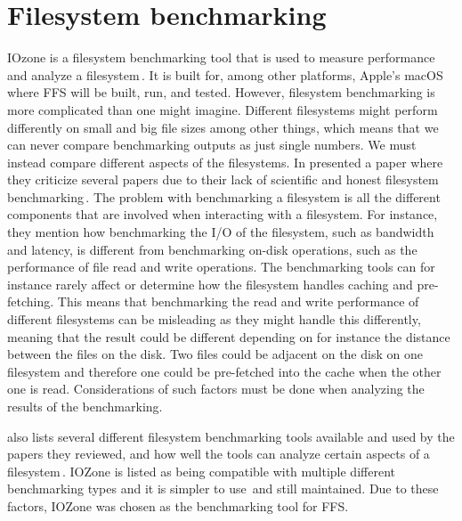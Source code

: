 \section{Filesystem benchmarking}
\label{sec:iozone}
IOzone is a filesystem benchmarking tool that is used to measure performance and analyze a filesystem\,\cite{IozoneFilesystemBenchmark2016}. It is built for, among other platforms, Apple's macOS where \gls{FFS} will be built, run, and tested. However, filesystem benchmarking is more complicated than one might imagine. Different filesystems might perform differently on small and big file sizes among other things, which means that we can never compare benchmarking outputs as just single numbers. We must instead compare different aspects of the filesystems. In \citeyear{tarasovBenchmarkingFileSystem2011} \citeauthor{tarasovBenchmarkingFileSystem2011} presented a paper where they criticize several papers due to their lack of scientific and honest filesystem benchmarking\,\cite{tarasovBenchmarkingFileSystem2011}. The problem with benchmarking a filesystem is all the different components that are involved when interacting with a filesystem. For instance, they mention how benchmarking the \gls{I/O} of the filesystem, such as bandwidth and latency, is different from benchmarking \mbox{on-disk} operations, such as the performance of file read and write operations. The benchmarking tools can for instance rarely affect or determine how the filesystem handles caching and \mbox{pre-fetching}. This means that benchmarking the read and write performance of different filesystems can be misleading as they might handle this differently, meaning that the result could be different depending on for instance the distance between the files on the disk. Two files could be adjacent on the disk on one filesystem and therefore one could be \mbox{pre-fetched} into the cache when the other one is read. Considerations of such factors must be done when analyzing the results of the benchmarking.

\citeauthor{tarasovBenchmarkingFileSystem2011} also lists several different filesystem benchmarking tools available and used by the papers they reviewed, and how well the tools can analyze certain aspects of a filesystem\,\cite{tarasovBenchmarkingFileSystem2011}. IOZone is listed as being compatible with multiple different benchmarking types and it is simpler to use\,\cite{agarwalComparingIOBenchmarks2018} and still maintained. Due to these factors, IOZone was chosen as the benchmarking tool for \gls{FFS}.